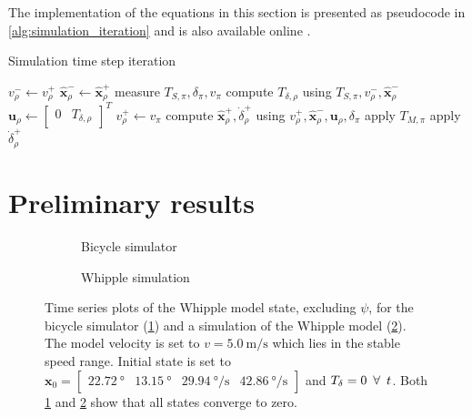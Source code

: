 \documentclass{icsc}
\newcommand{\state}{\bm{x}}
\newcommand{\sysInput}{\bm{u}}
\newcommand{\stateEst}{\hat{\bm{x}}}
\newcommand{\yaw}{\psi}
\newcommand{\steer}{\delta}
\newcommand{\steerRate}{\dot{\delta}}
\newcommand{\pre}{-}
\newcommand{\post}{+}
\newcommand{\virtual}{\rho}
\newcommand{\physical}{\pi}
\begin{document}
The implementation of the equations in this section is presented as pseudocode in \autoref{alg:simulation_iteration}
and is also available online \cite{lee2017}.\\
\begin{algorithm}[H]
\caption{Simulation time step iteration}
\label{alg:simulation_iteration}
\begin{algorithmic}[1]
    \State $v^\pre_\virtual \leftarrow v^\post_\virtual$
    \State $\stateEst^\pre_\virtual \leftarrow \stateEst^\post_\virtual$
    \State measure $T_{S,\physical}, \steer_\physical, v_\physical$
    \State compute $T_{\steer,\virtual}$ using $T_{S,\physical}, v^\pre_\virtual, \stateEst^\pre_\virtual$
    \State $\sysInput_\virtual \leftarrow \begin{bmatrix} 0 & T_{\steer,\virtual}\end{bmatrix}^T$
    \State $v^\post_\virtual \leftarrow v_{\physical}$
    \State compute $\stateEst^\post_\virtual, \steerRate^\post_\virtual$ using $v^\post_\virtual, \stateEst^\pre_\virtual, \sysInput_\virtual, \steer_\physical$
    \State apply $ T_{M,\physical} $
    \State apply $\steerRate^\post_\virtual$
\end{algorithmic}
\end{algorithm}

\section{Preliminary results}

\begin{figure}
\centering
\begin{subfigure}{0.45\textwidth}
    \centering
    \captionsetup{width=\linewidth}
    
    \caption{Bicycle simulator}
    \label{fig:state_ph}
\end{subfigure}
\hfill
\begin{subfigure}{0.45\textwidth}
    \centering
    \captionsetup{width=\linewidth}
    
    \caption{Whipple simulation}
    \label{fig:state_py}
\end{subfigure}
\caption[alt-caption]{Time series plots of the Whipple model state, excluding $\yaw$, for the bicycle simulator
    (\ref{fig:state_ph}) and a simulation of the Whipple model (\ref{fig:state_py}).
    The model velocity is set to $v = \SI{5.0}{\meter\per\second}$ which lies in the stable speed range.
    Initial state is set to $\state_0 = \begin{bmatrix}
        \SI{22.72}{\degree} & \SI{13.15}{\degree} & \SI{29.94}{\degree\per\second} & \SI{42.86}{\degree\per\second}
    \end{bmatrix}$ and $T_{\steer} = 0
    \enskip \forall \enskip t$.
    Both \ref{fig:state_ph} and \ref{fig:state_py} show that all states converge to zero.}
\label{fig:test}
\end{figure}
\end{document}
